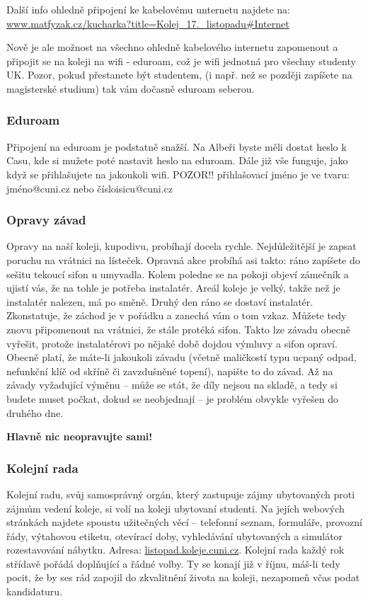 Další info ohledně připojení ke kabelovému unternetu najdete na:\\
\url{www.matfyzak.cz/kucharka?title=Kolej_17._listopadu#Internet}

Nově je ale možnost na všechno ohledně kabelového internetu zapomenout a připojit se na koleji na wifi - eduroam, 
což je wifi jednotná pro všechny studenty UK. Pozor, pokud přestanete být studentem, 
(i např. než se později zapíšete na magisterské studium) tak vám dočasně eduroam seberou. 


\subsubsection{Eduroam}
Připojení na eduroam je podstatně snažší. Na Albeři byste měli dostat heslo k Casu,
kde si mužete poté nastavit heslo na eduroam. Dále již vše funguje, jako když se přihlašujete na jakoukoli wifi.
POZOR!! přihlašovací jméno je ve tvaru: jméno@cuni.cz nebo čísloisicu@cuni.cz


\subsubsection{Opravy závad}
Opravy na naší koleji, kupodivu, probíhají docela rychle. Nejdůležitější je
zapsat poruchu na vrátnici na lísteček. Opravná akce probíhá asi takto: ráno
zapíšete do sešitu tekoucí sifon u umyvadla. Kolem poledne se na pokoji objeví
zámečník a ujistí vás, že na tohle je potřeba instalatér. Areál koleje je velký,
takže než je instalatér nalezen, má po směně. Druhý den ráno se dostaví
instalatér. Zkonstatuje, že záchod je v pořádku a zanechá vám o tom vzkaz.
Můžete tedy znovu připomenout na vrátnici, že stále protéká sifon. Takto lze
závadu obecně vyřešit, protože instalatérovi po nějaké době dojdou výmluvy a
sifon opraví. Obecně platí, že máte-li jakoukoli závadu (včetně maličkostí typu
ucpaný odpad, nefunkční klíč od skříně či zavzdušněné topení), napište to do
závad. Až na závady vyžadující výměnu – může se stát, že díly nejsou na skladě,
a tedy si budete muset počkat, dokud se neobjednají – je problém obvykle vyřešen
do druhého dne.

\textbf{Hlavně nic neopravujte sami!}


\subsubsection{Kolejní rada}
Kolejní radu, svůj samosprávný orgán, který zastupuje zájmy ubytovaných proti
zájmům vedení koleje, si volí na koleji ubytovaní studenti. Na jejích webových
stránkách najdete spoustu užitečných věcí – telefonní seznam, formuláře,
provozní řády, výtahovou etiketu, otevírací doby, vyhledávání ubytovaných a
simulátor rozestavování nábytku. Adresa: \url{listopad.koleje.cuni.cz}.
Kolejní rada každý rok střídavě pořádá doplňující a řádné volby.
Ty se konají již v říjnu, máš-li tedy pocit, že by ses rád zapojil do
zkvalitnění života na koleji, nezapomeň včas podat kandidaturu.


